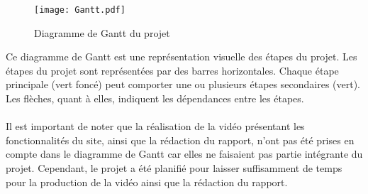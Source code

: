 \begin{landscape}
\begin{figure}[htbp]
\vspace{4mm}

  \centering
  \texttt{[image: Gantt.pdf]}
  \caption{Diagramme de Gantt du projet}
\label{fig:pdf-horizontal}
\end{figure}

Ce diagramme de Gantt est une représentation visuelle des étapes du projet. 
Les étapes du projet sont représentées par des barres horizontales. 
Chaque étape principale (vert foncé) peut comporter une ou plusieurs étapes secondaires (vert). 
Les flèches, quant à elles, indiquent les dépendances entre les étapes.\\\\

Il est important de noter que la réalisation de la vidéo présentant les fonctionnalités du site, ainsi que la rédaction du rapport, n'ont pas été prises en compte dans le diagramme de Gantt car elles ne faisaient pas partie intégrante du projet. Cependant, le projet a été planifié pour laisser suffisamment de temps pour la production de la vidéo ainsi que la rédaction du rapport.
\end{landscape}
